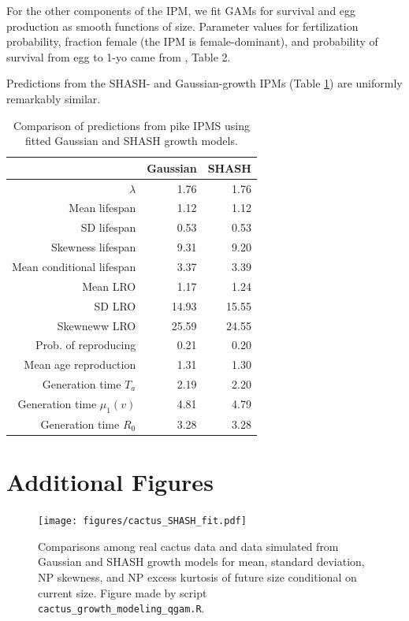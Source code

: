 \documentclass[12pt]{article}
\begin{document}
For the other components of the IPM, we fit GAMs for survival and egg production as smooth functions of size. 
Parameter values for fertilization probability, fraction female (the IPM is female-dominant), and probability of survival from egg to 1-yo 
came from \cite{stubberud2019effects}, Table 2. 

Predictions from the SHASH- and Gaussian-growth IPMs (Table \ref{tab:pike}) are uniformly remarkably similar. 

\begin{table}[ht]
\caption{Comparison of predictions from pike IPMS using fitted Gaussian and SHASH growth models.} 
\centering
\begin{tabular}{rrr}
  \hline
 & Gaussian & SHASH \\ 
  \hline
$\lambda$ & 1.76 & 1.76 \\ 
  Mean lifespan & 1.12 & 1.12 \\ 
  SD lifespan & 0.53 & 0.53 \\ 
  Skewness lifespan & 9.31 & 9.20 \\ 
 Mean conditional lifespan & 3.37 & 3.39 \\ 
 Mean LRO & 1.17 & 1.24 \\ 
 SD LRO & 14.93 & 15.55 \\ 
 Skewneww LRO & 25.59 & 24.55 \\ 
 Prob. of reproducing & 0.21 & 0.20 \\ 
 Mean age reproduction & 1.31 & 1.30 \\ 
  Generation time $T_a$ & 2.19 & 2.20 \\ 
  Generation time $\mu_1(v)$ & 4.81 & 4.79 \\ 
  Generation time $R_0$ & 3.28 & 3.28 \\ 
   \hline
\end{tabular}
\label{tab:pike}
\end{table}


\clearpage 
 
\section{Additional Figures}
\label{sec:additionalFigs}
 
 \begin{figure}[h!]
 	\centering
 	\texttt{[image: figures/cactus\_SHASH\_fit.pdf]}
 	\caption{Comparisons among real cactus data and data simulated from Gaussian and SHASH growth models for mean, standard deviation, NP skewness, and NP excess kurtosis of future size conditional on current size. Figure made by script \texttt{cactus\_growth\_modeling\_qgam.R}.}
 	\label{fig:cactus_fit}
 \end{figure} 
\end{document}
